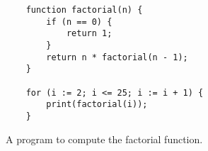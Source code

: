 \begin{figure}[!ht]
\centering
\begin{verbatim}
    function factorial(n) {
        if (n == 0) {
            return 1;
        }
        return n * factorial(n - 1);
    }
    
    for (i := 2; i <= 25; i := i + 1) {
        print(factorial(i));
    }                 
\end{verbatim}
\vspace*{-0.3cm}
\caption{A program to compute the factorial function.}
\label{fig:factorial.sl}
\end{figure}
    




